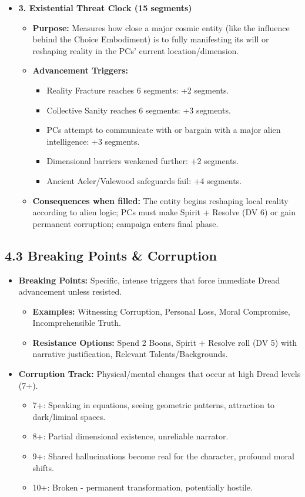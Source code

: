\documentclass[11pt]{article}
\begin{document}
\begin{itemize}
\item \textbf{3. Existential Threat Clock (15 segments)}
\begin{itemize}
\item \textbf{Purpose:} Measures how close a major cosmic entity (like the influence behind the Choice Embodiment) is to fully manifesting its will or reshaping reality in the PCs' current location/dimension.
\item \textbf{Advancement Triggers:}
\begin{itemize}
\item Reality Fracture reaches 6 segments: +2 segments.
\item Collective Sanity reaches 6 segments: +3 segments.
\item PCs attempt to communicate with or bargain with a major alien intelligence: +3 segments.
\item Dimensional barriers weakened further: +2 segments.
\item Ancient Aeler/Valewood safeguards fail: +4 segments.
\end{itemize}
\item \textbf{Consequences when filled:} The entity begins reshaping local reality according to alien logic; PCs must make Spirit + Resolve (DV 6) or gain permanent corruption; campaign enters final phase.
\end{itemize}
\end{itemize}

\clearpage

\subsection*{4.3 Breaking Points \& Corruption}

\begin{itemize}
\item \textbf{Breaking Points:} Specific, intense triggers that force immediate Dread advancement unless resisted.
\begin{itemize}
\item \textbf{Examples:} Witnessing Corruption, Personal Loss, Moral Compromise, Incomprehensible Truth.
\item \textbf{Resistance Options:} Spend 2 Boons, Spirit + Resolve roll (DV 5) with narrative justification, Relevant Talents/Backgrounds.
\end{itemize}
\item \textbf{Corruption Track:} Physical/mental changes that occur at high Dread levels (7+).
\begin{itemize}
\item 7+: Speaking in equations, seeing geometric patterns, attraction to dark/liminal spaces.
\item 8+: Partial dimensional existence, unreliable narrator.
\item 9+: Shared hallucinations become real for the character, profound moral shifts.
\item 10+: Broken - permanent transformation, potentially hostile.
\end{itemize}
\end{itemize}
\end{document}
